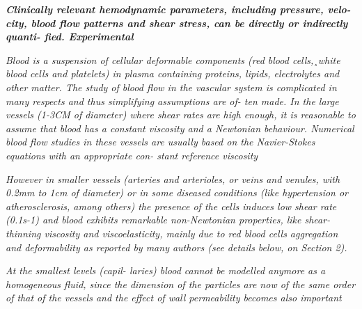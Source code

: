 \documentclass[11pt,letterpaper]{article}
\begin{document}
\textbf{\textit{Clinically relevant hemodynamic parameters, including pressure, velo-
city, blood flow patterns and shear stress, can be directly or indirectly quanti- fied. Experimental}}



\textit{Blood is a suspension of cellular deformable components (red blood cells,¸white blood cells and platelets) in plasma containing proteins, lipids, electrolytes and other matter. The study of blood flow in the vascular system is complicated in many respects and thus simplifying assumptions are of- ten made. In the large vessels (1-3CM of diameter) where shear rates are high enough, it is reasonable to assume that blood has a constant viscosity and a Newtonian behaviour. Numerical blood flow studies in these vessels are usually based on the Navier-Stokes equations with an appropriate con- stant reference viscosity}


\textit{However in smaller vessels (arteries and arterioles, or veins and venules, with 0.2mm to 1cm of diameter) or in some diseased conditions (like hypertension or atherosclerosis, among others) the presence of the cells induces low shear rate (0.1s-1) and blood exhibits remarkable non-Newtonian properties, like shear-thinning viscosity and viscoelasticity, mainly due to red blood cells aggregation and deformability as reported by many authors (see details below, on Section 2). }


\textit{At the smallest levels (capil- laries) blood cannot be modelled anymore as a homogeneous fluid, since the dimension of the particles are now of the same order of that of the vessels and the effect of wall permeability becomes also important}
\end{document}
